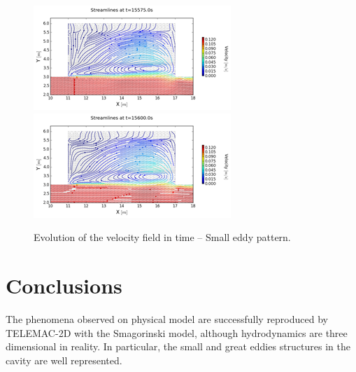 \begin{figure}
\includegraphics{img/image134}
\includegraphics{img/image135}
  \caption{Evolution of the velocity field in time – Small eddy pattern.}\label{fig:cavity:evol}
\end{figure}

\section{Conclusions}
The phenomena observed on physical model are successfully reproduced by
TELEMAC-2D with the Smagorinski model, although hydrodynamics are three
dimensional in reality. In particular, the small and great eddies structures in
the cavity are well represented.

